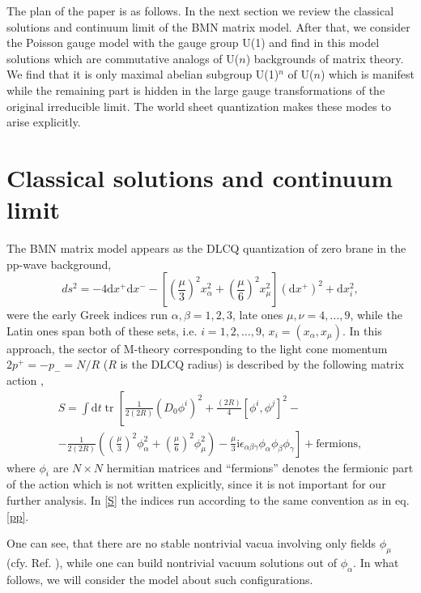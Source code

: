 \documentclass[a4paper]{article}
\newcommand{\ii}{\mathrm{i}}
\newcommand{\dd}{\mathrm{d}}
\newcommand{\tr}{\mathop{\mathrm{tr}}\nolimits}
\begin{document}
The plan of the paper is as follows. In the next section we review
the classical solutions and continuum limit of the BMN matrix
model. After that, we consider the Poisson gauge model with the
gauge group U(1) and find in this model solutions which are
commutative analogs of U($n$) backgrounds of matrix theory. We
find that it is only maximal abelian subgroup U(1)$^n$ of U($n$)
which is manifest while the remaining part is hidden in the large
gauge transformations of the original irreducible limit. The world
sheet quantization makes these modes to arise explicitly.


\section{Classical solutions and continuum limit}
The BMN matrix model appears as the DLCQ quantization of zero
brane in the pp-wave background,
\begin{equation}\label{pp}
ds^2=-4\dd x^+\dd
x^--\left[\left(\frac{\mu}{3}\right)^2x_\alpha^2+
\left(\frac{\mu}{6}\right)^2x_\mu^2\right](\dd x^+)^2+\dd x_i^2,
\end{equation}
were the early Greek indices run $\alpha,\beta=1,2,3$, late ones
$\mu,\nu=4,\dots ,9$, while the Latin ones span both of these sets,
i.e. $i=1,2,\dots,9$, $x_i=(x_\alpha,x_\mu)$. In this approach,
the sector of M-theory corresponding to the light cone momentum
$2p^+=-p_-=N/R$ ($R$ is the DLCQ radius) is described by the following
matrix action \cite{Berenstein:2002zw},
\begin{multline}\label{S}
S=\int \dd t \tr \left[\frac{1}{2(2R)}(D_0\phi^i)^2
+\frac{(2R)}{4}[\phi^i,\phi^j]^2-\right. \\
\left.-\frac{1}{2(2R)}\left(\left(\frac{\mu}{3}\right)^2\phi_\alpha^2+
\left(\frac{\mu}{6}\right)^2\phi_\mu^2\right)-\frac{\mu}{3}\ii
\epsilon_{\alpha\beta\gamma} \phi_\alpha\phi_\beta\phi_\gamma\right]
+\text{fermions},
\end{multline}
where $\phi_i$ are $N\times N$ hermitian matrices and ``fermions''
denotes the fermionic part of the action which is not written
explicitly, since it is not important for our further analysis. In
\eqref{S} the indices run according to the same convention as in
eq. \eqref{pp}.

One can see, that there are no stable nontrivial vacua involving
only fields $\phi_\mu$ (cfy. Ref. \cite{Valtancoli:2002rx}), while
one can build nontrivial vacuum solutions out of $\phi_\alpha$. In
what follows, we will consider the model about such
configurations.
\end{document}
